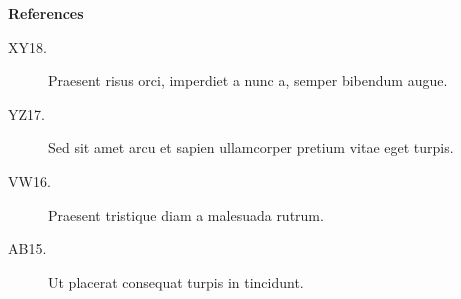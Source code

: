 \documentclass[helvet,logo=Bilder/Katze,hlcolor=F70146]{modernposter}
\begin{document}
\begin{postercolumn}
{      {\bf References}
      \begin{description}
        \item[XY18.] Praesent risus orci, imperdiet a nunc a, semper bibendum augue. 
        \item[YZ17.] Sed sit amet arcu et sapien ullamcorper pretium vitae eget turpis.
        \item[VW16.] Praesent tristique diam a malesuada rutrum. 
        \item[AB15.] Ut placerat consequat turpis in tincidunt.
      \end{description}
    }
\end{postercolumn}
 
\end{document}
